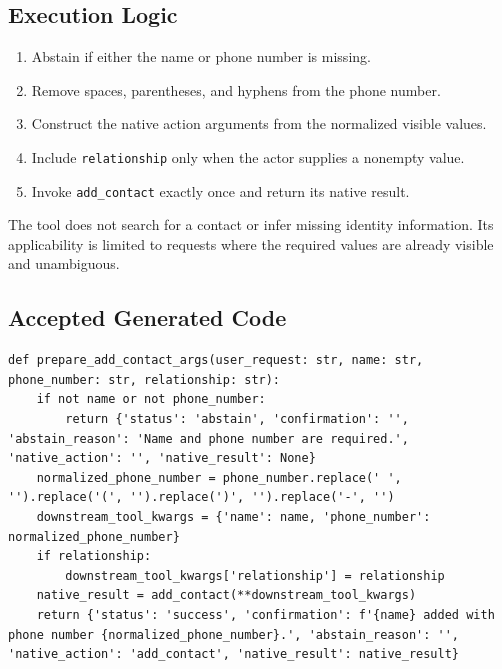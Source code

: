 \subsection{Execution Logic}\label{execution-logic}

\begin{enumerate}
\def\labelenumi{\arabic{enumi}.}
\tightlist
\item
  Abstain if either the name or phone number is missing.
\item
  Remove spaces, parentheses, and hyphens from the phone number.
\item
  Construct the native action arguments from the normalized visible
  values.
\item
  Include \texttt{relationship} only when the actor supplies a nonempty
  value.
\item
  Invoke \texttt{add\_contact} exactly once and return its native
  result.
\end{enumerate}

The tool does not search for a contact or infer missing identity
information. Its applicability is limited to requests where the required
values are already visible and unambiguous.

\subsection{Accepted Generated Code}\label{accepted-generated-code}

\begin{lstlisting}[style=sagepython,caption={Accepted contact-creation native-action tool.},label={lst:sage-prepare-add-contact}]
def prepare_add_contact_args(user_request: str, name: str, phone_number: str, relationship: str):
    if not name or not phone_number:
        return {'status': 'abstain', 'confirmation': '', 'abstain_reason': 'Name and phone number are required.', 'native_action': '', 'native_result': None}
    normalized_phone_number = phone_number.replace(' ', '').replace('(', '').replace(')', '').replace('-', '')
    downstream_tool_kwargs = {'name': name, 'phone_number': normalized_phone_number}
    if relationship:
        downstream_tool_kwargs['relationship'] = relationship
    native_result = add_contact(**downstream_tool_kwargs)
    return {'status': 'success', 'confirmation': f'{name} added with phone number {normalized_phone_number}.', 'abstain_reason': '', 'native_action': 'add_contact', 'native_result': native_result}
\end{lstlisting}

